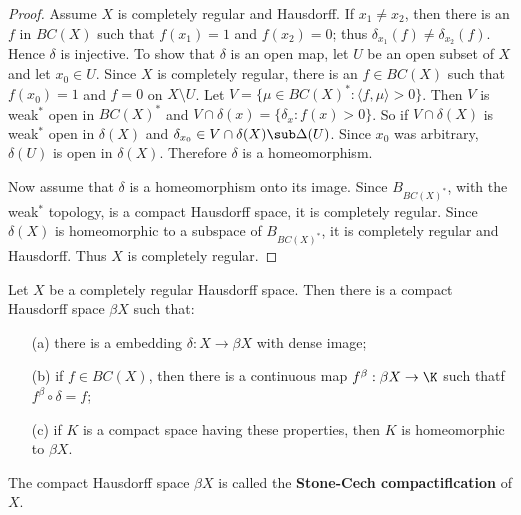 \begin{proof}
Assume $X$ is completely regular and Hausdorff. If $x_1\neq x_2$, then there is an $f$ in $BC(X)$ such that $f(x_1)=1$ and $f(x_2)=0$; thus $\delta_{x_1}(f)\neq\delta_{x_2}(f)$. Hence $\delta$ is injective. To show that $\delta$ is an open map, let $U$ be an open subset of $X$ and let $x_0\in U$. Since $X$ is completely regular, there is an $f\in BC(X)$ such that $f(x_0)=1$ and $f=0$ on $X\setminus U$. Let $V=\{\mu\in BC(X)^*:\langle f,\mu\rangle>0\}$. Then $V$ is weak$^*$ open in $BC(X)^*$ and $V\cap\delta(x)=\{\delta_x:f(x)>0\}$. So if $V\cap\delta(X)$ is weak$^*$ open in $\delta(X)$ and $\delta_{x_0}\in V\cap\delta(X)\sub\Delta(U)$. Since $x_0$ was arbitrary, $\delta(U)$ is open in $\delta(X)$. Therefore $\delta$ is a homeomorphism.\par
Now assume that $\delta$ is a homeomorphism onto its image. Since $B_{BC(X)^*}$, with the weak$^*$ topology, is a compact Hausdorff space, it is completely regular. Since $\delta(X)$ is homeomorphic to a subspace of $B_{BC(X)^*}$, it is completely regular and Hausdorff. Thus $X$ is completely regular.
\end{proof}
\begin{theorem}
Let $X$ be a completely regular Hausdorff space. Then there is a compact Hausdorff space $\beta X$ such that:
\begin{itemize}
\item[(a)] there is a embedding $\delta:X\to\beta X$ with dense image;
\item[(b)] if $f\in BC(X)$, then there is a continuous map $f^\beta:\beta X\to\K$ such thatf $f^\beta\circ\delta=f$;
\item[(c)] if $K$ is a compact space having these properties, then $K$ is
homeomorphic to $\beta X$.
\end{itemize}
The compact Hausdorff space $\beta X$ is called the \textbf{Stone-Cech compactiflcation} of $X$.
\end{theorem}
